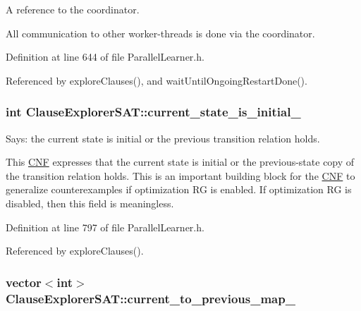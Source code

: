A reference to the coordinator. 

All communication to other worker-\/threads is done via the coordinator. 

Definition at line 644 of file Parallel\-Learner.\-h.



Referenced by explore\-Clauses(), and wait\-Until\-Ongoing\-Restart\-Done().

\hypertarget{classClauseExplorerSAT_a210b4a062e0a949536b172d904a2219f}{
\subsubsection[{current\-\_\-state\-\_\-is\-\_\-initial\-\_\-}]{\setlength{\rightskip}{0pt plus 5cm}int Clause\-Explorer\-S\-A\-T\-::current\-\_\-state\-\_\-is\-\_\-initial\-\_\-\hspace{0.3cm}{\ttfamily [protected]}}}\label{classClauseExplorerSAT_a210b4a062e0a949536b172d904a2219f}


Says\-: the current state is initial or the previous transition relation holds. 

This \hyperlink{classCNF}{C\-N\-F} expresses that the current state is initial or the previous-\/state copy of the transition relation holds. This is an important building block for the \hyperlink{classCNF}{C\-N\-F} to generalize counterexamples if optimization R\-G is enabled. If optimization R\-G is disabled, then this field is meaningless. 

Definition at line 797 of file Parallel\-Learner.\-h.



Referenced by explore\-Clauses().

\hypertarget{classClauseExplorerSAT_aecf42678820d41d716fb23f833066da2}{
\subsubsection[{current\-\_\-to\-\_\-previous\-\_\-map\-\_\-}]{\setlength{\rightskip}{0pt plus 5cm}vector$<$int$>$ Clause\-Explorer\-S\-A\-T\-::current\-\_\-to\-\_\-previous\-\_\-map\-\_\-\hspace{0.3cm}{\ttfamily [protected]}}}\label{classClauseExplorerSAT_aecf42678820d41d716fb23f833066da2}


